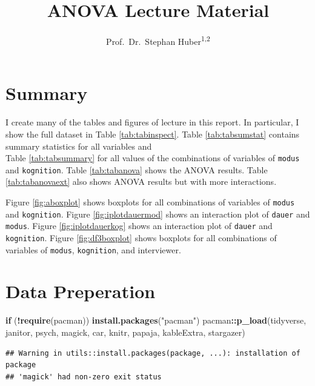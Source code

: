 \documentclass[
  doc,floatsintext]{apa6}
\title{ANOVA Lecture Material}
\author{Prof.~Dr.~Stephan Huber\textsuperscript{1,2}}
\date{}
\affiliation{\vspace{0.5cm}\textsuperscript{1} Fresenius University of Applied Science\\\textsuperscript{2} Charlotte Fresenius University}
\newenvironment{Shaded}{\begin{snugshade}}{\end{snugshade}}
\newcommand{\ControlFlowTok}[1]{\textcolor[rgb]{0.13,0.29,0.53}{\textbf{#1}}}
\newcommand{\FunctionTok}[1]{\textcolor[rgb]{0.13,0.29,0.53}{\textbf{#1}}}
\newcommand{\NormalTok}[1]{#1}
\newcommand{\SpecialCharTok}[1]{\textcolor[rgb]{0.81,0.36,0.00}{\textbf{#1}}}
\newcommand{\StringTok}[1]{\textcolor[rgb]{0.31,0.60,0.02}{#1}}
\begin{document}
\maketitle

{
\setcounter{tocdepth}{3}
\tableofcontents
}
\hypertarget{summary}{%
\section{Summary}\label{summary}}

I create many of the tables and figures of lecture in this report. In particular, I show the full dataset in
Table \ref{tab:tabinspect}.
Table \ref{tab:tabsumstat} contains summary statistics for all variables and\\
Table \ref{tab:tabsummary} for all values of the combinations of variables of \texttt{modus} and \texttt{kognition}.
Table \ref{tab:tabanova} shows the ANOVA results.
Table \ref{tab:tabanovaext} also shows ANOVA results but with more interactions.

Figure \ref{fig:aboxplot} shows boxplots for all combinations of variables of \texttt{modus} and \texttt{kognition}.
Figure \ref{fig:iplotdauermod} shows an interaction plot of \texttt{dauer} and \texttt{modus}.
Figure \ref{fig:iplotdauerkog} shows an interaction plot of \texttt{dauer} and \texttt{kognition}.
Figure \ref{fig:df3boxplot} shows boxplots for all combinations of variables of \texttt{modus}, \texttt{kognition}, and interviewer.

\hypertarget{data-preperation}{%
\section{Data Preperation}\label{data-preperation}}

\begin{Shaded}
\begin{Highlighting}[]
\ControlFlowTok{if}\NormalTok{ (}\SpecialCharTok{!}\FunctionTok{require}\NormalTok{(pacman)) }\FunctionTok{install.packages}\NormalTok{(}\StringTok{"pacman"}\NormalTok{)}
\NormalTok{pacman}\SpecialCharTok{::}\FunctionTok{p\_load}\NormalTok{(tidyverse, janitor, psych, magick, }
\NormalTok{               car, knitr, papaja, kableExtra, stargazer)}
\end{Highlighting}
\end{Shaded}

\begin{verbatim}
## Warning in utils::install.packages(package, ...): installation of package
## 'magick' had non-zero exit status
\end{verbatim}
\end{document}
